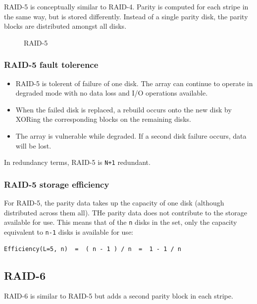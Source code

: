 RAID-5 is conceptually similar to RAID-4. Parity is computed for each
stripe in the same way, but is stored differently. Instead of a single
parity disk, the parity blocks are distributed amongst all disks.

\begin{figure}
\centering
\caption{RAID-5}
\end{figure}

\subsubsection{RAID-5 fault tolerence}\label{raid-5-fault-tolerence}

\begin{itemize}
\item
  RAID-5 is tolerent of failure of one disk. The array can continue to
  operate in degraded mode with no data loss and I/O operations
  available.
\item
  When the failed disk is replaced, a rebuild occurs onto the new disk
  by XORing the corresponding blocks on the remaining disks.
\item
  The array is vulnerable while degraded. If a second disk failure
  occurs, data will be lost.
\end{itemize}

In redundancy terms, RAID-5 is \texttt{N+1} redundant.

\subsubsection{RAID-5 storage
efficiency}\label{raid-5-storage-efficiency}

For RAID-5, the parity data takes up the capacity of one disk (although
distributed across them all). THe parity data does not contribute to the
storage available for use. This means that of the \texttt{n} disks in
the set, only the capacity equivalent to \texttt{n-1} disks is available
for use:

\begin{verbatim}
Efficiency(L=5, n)  =  ( n - 1 ) / n  =  1 - 1 / n 
\end{verbatim}

\subsection{RAID-6}\label{raid-6}

RAID-6 is similar to RAID-5 but adds a second parity block in each
stripe.

